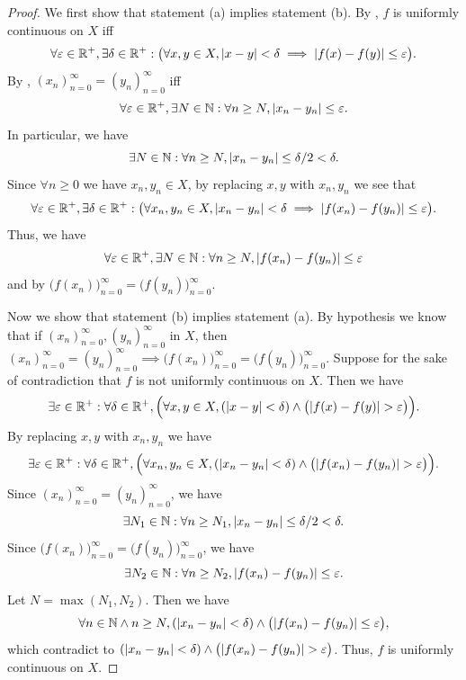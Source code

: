 \begin{proof}
  We first show that statement (a) implies statement (b).
  By , \(f\) is uniformly continuous on \(X\) iff
  \[
    \forall \varepsilon \in \mathbb{R}^+, \exists \delta \in \mathbb{R}^+ : \big(\forall x, y \in X, \left\lvert x - y\right\rvert < \delta \implies \left\lvert f(x) - f(y)\right\rvert \leq \varepsilon\big).
  \]
  By , \((x_n)_{n = 0}^\infty = (y_n)_{n = 0}^\infty\) iff
  \[
    \forall \varepsilon \in \mathbb{R}^+, \exists N \in \mathbb{N} : \forall n \geq N, \left\lvert x_n - y_n\right\rvert \leq \varepsilon.
  \]
  In particular, we have
  \[
    \exists N \in \mathbb{N} : \forall n \geq N, \left\lvert x_n - y_n\right\rvert \leq \delta / 2 < \delta.
  \]
  Since \(\forall n \geq 0\) we have \(x_n, y_n \in X\), by replacing \(x, y\) with \(x_n, y_n\) we see that
  \[
    \forall \varepsilon \in \mathbb{R}^+, \exists \delta \in \mathbb{R}^+ : \big(\forall x_n, y_n \in X, \left\lvert x_n - y_n\right\rvert < \delta \implies \left\lvert f(x_n) - f(y_n)\right\rvert \leq \varepsilon\big).
  \]
  Thus, we have
  \[
    \forall \varepsilon \in \mathbb{R}^+, \exists N \in \mathbb{N} : \forall n \geq N, \left\lvert f(x_n) - f(y_n)\right\rvert \leq \varepsilon
  \]
  and by  \(\big(f(x_n)\big)_{n = 0}^\infty = \big(f(y_n)\big)_{n = 0}^\infty\).

  Now we show that statement (b) implies statement (a).
  By hypothesis we know that if \((x_n)_{n = 0}^\infty, (y_n)_{n = 0}^\infty\) in \(X\), then \((x_n)_{n = 0}^\infty = (y_n)_{n = 0}^\infty \implies \big(f(x_n)\big)_{n = 0}^\infty = \big(f(y_n)\big)_{n = 0}^\infty\).
  Suppose for the sake of contradiction that \(f\) is not uniformly continuous on \(X\).
  Then we have
  \[
    \exists \varepsilon \in \R^+ : \forall \delta \in \R^+, \Big(\forall x, y \in X, (\abs{x - y} < \delta) \land \big(\abs{f(x) - f(y)} > \varepsilon\big)\Big).
  \]
  By replacing \(x, y\) with \(x_n, y_n\) we have
  \[
    \exists \varepsilon \in \R^+ : \forall \delta \in \R^+, \Big(\forall x_n, y_n \in X, (\abs{x_n - y_n} < \delta) \land \big(\abs{f(x_n) - f(y_n)} > \varepsilon\big)\Big).
  \]
  Since \((x_n)_{n = 0}^\infty = (y_n)_{n = 0}^\infty\), we have
  \[
    \exists N_1 \in \mathbb{N} : \forall n \geq N_1, \left\lvert x_n - y_n\right\rvert \leq \delta / 2 < \delta.
  \]
  Since \(\big(f(x_n)\big)_{n = 0}^\infty = \big(f(y_n)\big)_{n = 0}^\infty\), we have
  \[
    \exists N_2 \in \mathbb{N} : \forall n \geq N_2, \left\lvert f(x_n) - f(y_n)\right\rvert \leq \varepsilon.
  \]
  Let \(N = \max(N_1, N_2)\).
  Then we have
  \[
    \forall n \in \N \land n \geq N, (\abs{x_n - y_n} < \delta) \land \big(\abs{f(x_n) - f(y_n)} \leq \varepsilon\big),
  \]
  which contradict to \((\abs{x_n - y_n} < \delta) \land \big(\abs{f(x_n) - f(y_n)} > \varepsilon\big)\).
  Thus, \(f\) is uniformly continuous on \(X\).
\end{proof}

